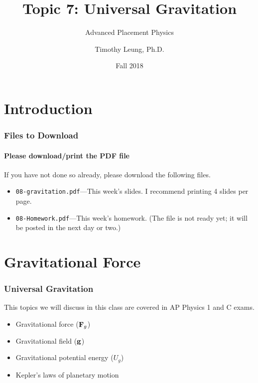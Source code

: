 \documentclass[12pt,compress,aspectratio=169]{beamer}
\title{Topic 7: Universal Gravitation}
\subtitle{Advanced Placement Physics}
\author[TML]{Timothy Leung, Ph.D.}
\institute{Olympiads School}
\date{Fall 2018}
\newcommand{\mb}[1]{\ensuremath\mathbf{#1}}
\begin{document}
\begin{frame}
  \maketitle
\end{frame}


\section[Intro]{Introduction}

\begin{frame}
  \frametitle{Files to Download}
  \framesubtitle{Please download/print the PDF file}
  If you have not done so already, please download the following files.
  \begin{itemize}
  \item\texttt{08-gravitation.pdf}---This week's
    slides. I recommend printing 4 slides per page.
  \item\texttt{08-Homework.pdf}---This week's homework. (The file is not ready
    yet; it will be posted in the next day or two.)
  \end{itemize}
\end{frame}





\section{Gravitational Force}
\begin{frame}
  \frametitle{Universal Gravitation}
  This topics we will discuss in this class are covered in AP Physics 1 and
  C exams.
  \begin{itemize}
  \item Gravitational force ($\mb{F}_g$)
  \item Gravitational field ($\mb{g}$)
  \item Gravitational potential energy  ($U_g$)
  \item Kepler's laws of planetary motion
  \end{itemize}
\end{frame}
\end{document}
